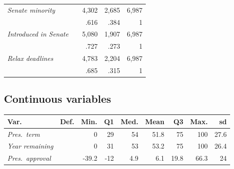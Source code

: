 \documentclass[letter,12pt]{article}
\begin{document}
\begin{tabular}{llrrr}
\emph{Senate minority}             &     &    4,302 &    2,685 &6,987 \\
                                   &     &   .616   &   .384   &   1  \\
\emph{Introduced in Senate}        &     &    5,080 &    1,907 &6,987 \\
                                   &     &   .727   &   .273   &   1  \\
\emph{Relax deadlines}             &     &    4,783 &    2,204 &6,987 \\
                                   &     &   .685   &   .315   &   1  \\
\end{tabular}

\subsection{Continuous variables}

\begin{tabular}{llrrrrrrr}
               Var.  & Def. &  Min.&  Q1 & Med. & Mean &  Q3  &  Max. &   sd \\ \hline
\emph{Pres.~term}    &      &  0   &  29 & 54   & 51.8 & 75   & 100   & 27.6 \\
\emph{Year remaining}&      &  0   &  31 & 53   & 53.2 & 75   & 100   & 26.4 \\
\emph{Pres.~approval}&      &-39.2 & -12 &  4.9 &  6.1 & 19.8 &  66.3 & 24   \\
\end{tabular}





\end{document}
